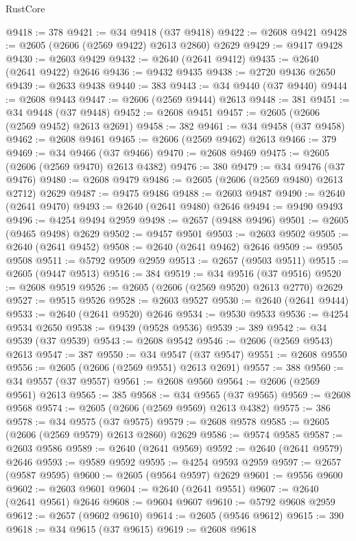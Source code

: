 \begin{lexlean}{RustCore}
\begin{coremodule}
@9418 := 378
@9421 := @34 @9418 (@37 @9418)
@9422 := @2608 @9421
@9428 := @2605 (@2606 (@2569 @9422) @2613 @2860) @2629
@9429 := @9417 @9428
@9430 := @2603 @9429
@9432 := @2640 (@2641 @9412)
@9435 := @2640 (@2641 @9422) @2646
@9436 := @9432 @9435
@9438 := @2720 @9436 @2650
@9439 := @2633 @9438
@9440 := 383
@9443 := @34 @9440 (@37 @9440)
@9444 := @2608 @9443
@9447 := @2606 (@2569 @9444) @2613
@9448 := 381
@9451 := @34 @9448 (@37 @9448)
@9452 := @2608 @9451
@9457 := @2605 (@2606 (@2569 @9452) @2613 @2691)
@9458 := 382
@9461 := @34 @9458 (@37 @9458)
@9462 := @2608 @9461
@9465 := @2606 (@2569 @9462) @2613
@9466 := 379
@9469 := @34 @9466 (@37 @9466)
@9470 := @2608 @9469
@9475 := @2605 (@2606 (@2569 @9470) @2613 @4382)
@9476 := 380
@9479 := @34 @9476 (@37 @9476)
@9480 := @2608 @9479
@9486 := @2605 (@2606 (@2569 @9480) @2613 @2712) @2629
@9487 := @9475 @9486
@9488 := @2603 @9487
@9490 := @2640 (@2641 @9470)
@9493 := @2640 (@2641 @9480) @2646
@9494 := @9490 @9493
@9496 := @4254 @9494 @2959
@9498 := @2657 (@9488 @9496)
@9501 := @2605 (@9465 @9498) @2629
@9502 := @9457 @9501
@9503 := @2603 @9502
@9505 := @2640 (@2641 @9452)
@9508 := @2640 (@2641 @9462) @2646
@9509 := @9505 @9508
@9511 := @5792 @9509 @2959
@9513 := @2657 (@9503 @9511)
@9515 := @2605 (@9447 @9513)
@9516 := 384
@9519 := @34 @9516 (@37 @9516)
@9520 := @2608 @9519
@9526 := @2605 (@2606 (@2569 @9520) @2613 @2770) @2629
@9527 := @9515 @9526
@9528 := @2603 @9527
@9530 := @2640 (@2641 @9444)
@9533 := @2640 (@2641 @9520) @2646
@9534 := @9530 @9533
@9536 := @4254 @9534 @2650
@9538 := @9439 (@9528 @9536)
@9539 := 389
@9542 := @34 @9539 (@37 @9539)
@9543 := @2608 @9542
@9546 := @2606 (@2569 @9543) @2613
@9547 := 387
@9550 := @34 @9547 (@37 @9547)
@9551 := @2608 @9550
@9556 := @2605 (@2606 (@2569 @9551) @2613 @2691)
@9557 := 388
@9560 := @34 @9557 (@37 @9557)
@9561 := @2608 @9560
@9564 := @2606 (@2569 @9561) @2613
@9565 := 385
@9568 := @34 @9565 (@37 @9565)
@9569 := @2608 @9568
@9574 := @2605 (@2606 (@2569 @9569) @2613 @4382)
@9575 := 386
@9578 := @34 @9575 (@37 @9575)
@9579 := @2608 @9578
@9585 := @2605 (@2606 (@2569 @9579) @2613 @2860) @2629
@9586 := @9574 @9585
@9587 := @2603 @9586
@9589 := @2640 (@2641 @9569)
@9592 := @2640 (@2641 @9579) @2646
@9593 := @9589 @9592
@9595 := @4254 @9593 @2959
@9597 := @2657 (@9587 @9595)
@9600 := @2605 (@9564 @9597) @2629
@9601 := @9556 @9600
@9602 := @2603 @9601
@9604 := @2640 (@2641 @9551)
@9607 := @2640 (@2641 @9561) @2646
@9608 := @9604 @9607
@9610 := @5792 @9608 @2959
@9612 := @2657 (@9602 @9610)
@9614 := @2605 (@9546 @9612)
@9615 := 390
@9618 := @34 @9615 (@37 @9615)
@9619 := @2608 @9618

\end{coremodule}
\end{lexlean}
